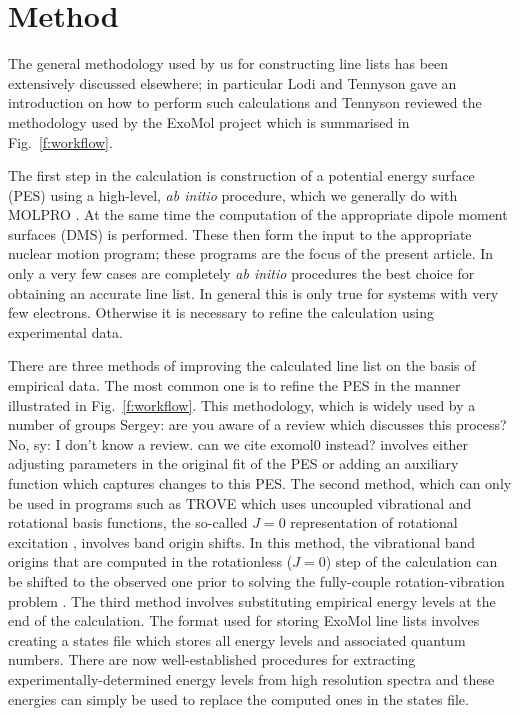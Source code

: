 \documentclass[12pt]{article}
\newcommand{\red}[1]{{\color{red} #1}}
\newcommand{\2}{$_{2}$}
\newcommand{\3}{$_{3}$}
\newcommand{\4}{$_{4}$}
\begin{document}
\section{Method}

The general methodology used by us for constructing line lists has been
extensively discussed elsewhere; in particular Lodi and Tennyson \cite{jt475}
gave an introduction on how to perform such calculations and Tennyson
\cite{jt511} reviewed the methodology used by the ExoMol project which
is summarised in
Fig.~\ref{f:workflow}.

The first step in the calculation is construction of a potential
energy surface (PES) using a high-level, {\it ab initio} procedure,
which we generally do with {\sc MOLPRO} \cite{12WeKnKn.methods}. At
the same time the computation of the appropriate dipole moment
surfaces (DMS) is performed. These then form the input to the
appropriate nuclear motion program; these programs are the focus of
the present article. In only a very few cases
\cite{jt298,jt347,jt506,jtH3+} are completely {\it ab initio}
procedures the best choice for obtaining an accurate line list.  In
general this is only true for systems with very few electrons.
Otherwise it is necessary to refine the calculation using experimental
data.

There are three methods of improving the calculated line list on
the basis of empirical data. The most common one is to refine the PES
in the manner illustrated in Fig.~\ref{f:workflow}. This
methodology, which is widely used by a number of groups
\cite{ps97,01TyTaSc.H2S,88Jexxxx.method}
\red{Sergey: are you aware
of a review which discusses this process? No, sy: I don't know a review. can we cite exomol0 instead?} 
involves either adjusting
parameters in the original fit of the PES or adding an auxiliary function
which captures changes to this PES. The second method, which can only
be used in programs such as {\sc TROVE} which uses uncoupled vibrational
and  rotational basis functions, the so-called $J=0$ representation
of rotational excitation \citet{09YuBaYa.NH3}, involves band origin shifts.
In this method, the vibrational band origins that are computed in
the rotationless ($J=0$) step of the calculation  can be shifted
to the observed one prior to solving the fully-couple rotation-vibration
problem \cite{syref2}. The third method involves substituting
empirical energy levels at the end of the calculation. The format used
for storing ExoMol line lists \cite{jt548,jt631} involves creating
a states file which stores all energy levels and associated quantum
numbers. There are now well-established procedures for extracting
experimentally-determined energy levels from high resolution spectra
\cite{jt412,12FuCsi.method,jt562} and these energies can simply
be used to replace the computed ones in the states file.
\end{document}
